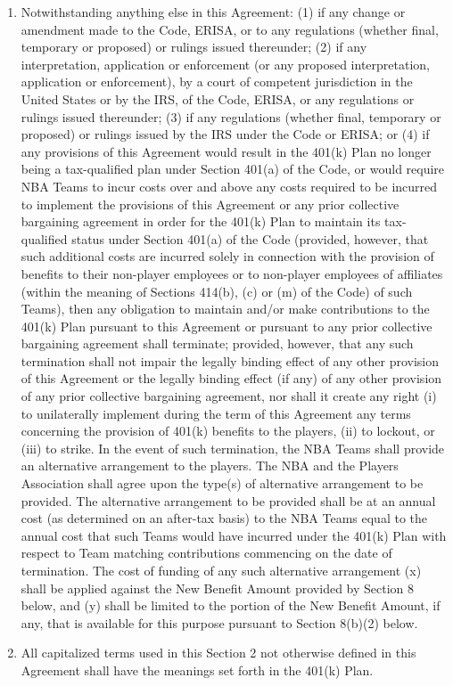 \documentclass[
]{book}
\begin{document}
\begin{enumerate}
\item
  Notwithstanding anything else in this Agreement: (1) if any change or amendment made to the Code, ERISA, or to any regulations (whether final, temporary or proposed) or rulings issued thereunder; (2) if any interpretation, application or enforcement (or any proposed interpretation, application or enforcement), by a court of competent jurisdiction in the United States or by the IRS, of the Code, ERISA, or any regulations or rulings issued thereunder; (3) if any regulations (whether final, temporary or proposed) or rulings issued by the IRS under the Code or ERISA; or (4) if any provisions of this Agreement would result in the 401(k) Plan no longer being a tax-qualified plan under Section 401(a) of the Code, or would require NBA Teams to incur costs over and above any costs required to be incurred to implement the provisions of this Agreement or any prior collective bargaining agreement in order for the 401(k) Plan to maintain its tax-qualified status under Section 401(a) of the Code (provided, however, that such additional costs are incurred solely in connection with the provision of benefits to their non-player employees or to non-player employees of affiliates (within the meaning of Sections 414(b), (c) or (m) of the Code) of such Teams), then any obligation to maintain and/or make contributions to the 401(k) Plan pursuant to this Agreement or pursuant to any prior collective bargaining agreement shall terminate; provided, however, that any such termination shall not impair the legally binding effect of any other provision of this Agreement or the legally binding effect (if any) of any other provision of any prior collective bargaining agreement, nor shall it create any right (i) to unilaterally implement during the term of this Agreement any terms concerning the provision of 401(k) benefits to the players, (ii) to lockout, or (iii) to strike. In the event of such termination, the NBA Teams shall provide an alternative arrangement to the players. The NBA and the Players Association shall agree upon the type(s) of alternative arrangement to be provided. The alternative arrangement to be provided shall be at an annual cost (as determined on an after-tax basis) to the NBA Teams equal to the annual cost that such Teams would have incurred under the 401(k) Plan with respect to Team matching contributions commencing on the date of termination. The cost of funding of any such alternative arrangement (x) shall be applied against the New Benefit Amount provided by Section 8 below, and (y) shall be limited to the portion of the New Benefit Amount, if any, that is available for this purpose pursuant to Section 8(b)(2) below.
\item
  All capitalized terms used in this Section 2 not otherwise defined in this Agreement shall have the meanings set forth in the 401(k) Plan.
\end{enumerate}
\end{document}
